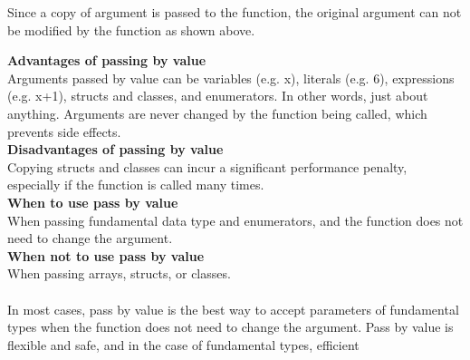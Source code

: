 \documentclass[11pt,fleqn]{book} %
\begin{document}
\begin{tcolorbox}[width=\textwidth,colback={white},title={KEYNOTE},colbacktitle=purple!50!white,coltitle=black]  
 	Since a copy of argument is passed to the function, the original argument can not be modified by the function as shown above.
 \end{tcolorbox}
\hfil \break
\textbf{Advantages of passing by value}\\
Arguments passed by value can be variables (e.g. x), literals (e.g. 6), expressions (e.g. x+1), structs and classes, and enumerators. In other words, just about anything.
Arguments are never changed by the function being called, which prevents side effects.\\
\textbf{Disadvantages of passing by value} \\
Copying structs and classes can incur a significant performance penalty, especially if the function is called many times.\\
\textbf{When to use pass by value}\\
When passing fundamental data type and enumerators, and the function does not need to change the argument.\\
\textbf{When not to use pass by value}\\
When passing arrays, structs, or classes.\\ \\
In most cases, pass by value is the best way to accept parameters of fundamental types when the function does not need to change the argument. Pass by value is flexible and safe, and in the case of fundamental types, efficient
\end{document}

